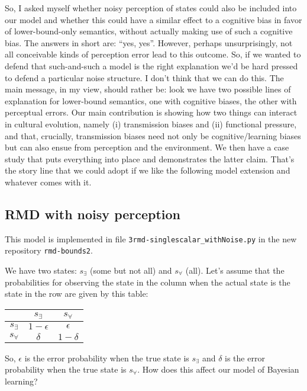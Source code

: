 \documentclass[fleqn,reqno,10pt]{article}
\begin{document}
So, I asked myself whether noisy perception of states could also be included into our model and
whether this could have a similar effect to a cognitive bias in favor of lower-bound-only
semantics, without actually making use of such a cognitive bias. The answers in short are:
``yes, yes''. However, perhaps unsurprisingly, not all conceivable kinds of perception error
lead to this outcome. So, if we wanted to defend that such-and-such a model is the right
explanation we'd be hard pressed to defend a particular noise structure. I don't think that we
can do this. The main message, in my view, should rather be: look we have two possible
lines of explanation for lower-bound semantics, one with cognitive biases, the other with
perceptual errors. Our main contribution is showing how two things can interact in cultural
evolution, namely (i) transmission biases and (ii) functional pressure, and that, crucially,
transmission biases need not only be cognitive/learning biases but can also ensue from
perception and the environment. We then have a case study that puts everything into place and
demonstrates the latter claim. That's the story line that we could adopt if we like the
following model extension and whatever comes with it.

\subsection*{RMD with noisy perception}

This model is implemented in file \texttt{3rmd-singlescalar\_withNoise.py} in the new repository
\texttt{rmd-bounds2}. 

We have two states: $s_\exists$ (some but not all) and $s_\forall$ (all). Let's assume that the
probabilities for observing the state in the column when the actual state is the state in the
row are given by this table:
\begin{center}
  \begin{tabular}{ccc}
    & $s_\exists$ & $s_\forall$ \\ \midrule 
    $s_\exists$ & $1-\epsilon$ & $\epsilon$ \\
    $s_\forall$ & $\delta$ & $1-\delta$
  \end{tabular}
\end{center}
So, $\epsilon$ is the error probability when the true state is $s_\exists$ and $\delta$ is the
error probability when the true state is $s_\forall$. How does this affect our model of
Bayesian learning?
\end{document}
